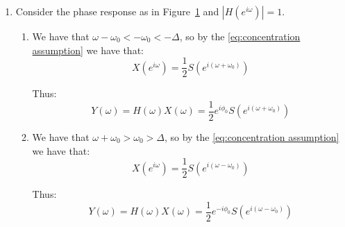 \begin{enumerate}
    \item \label{pt:phase step} Consider the phase response as in Figure~\ref{fig:phase response shelf} and $|H(e^{i\omega})| = 1$.
          \begin{figure}[ht!]
              \centering
              \caption{}
              \label{fig:phase response shelf}
          \end{figure}

          \begin{enumerate}[align = left]
              \item[``$\omega < 0$'':] \hfill

                    We have that $\omega - \omega_0 < -\omega_0 < -\Delta$, so by the \ref{eq:concentration assumption} we have that:
                    \[X(e^{i\omega}) = \frac{1}{2} S(e^{i(\omega + \omega_0)})\]

                    Thus:
                    \[Y(\omega)
                        = H(\omega) X(\omega)
                        = \frac{1}{2} e^{i\phi_0} S(e^{i(\omega + \omega_0)})\]
              \item[``$\omega \geq 0$'':] \hfill

                    We have that $\omega + \omega_0 > \omega_0 > \Delta$, so by the \ref{eq:concentration assumption} we have that:
                    \[X(e^{i\omega}) = \frac{1}{2} S(e^{i(\omega - \omega_0)})\]

                    Thus:
                    \[Y(\omega)
                        = H(\omega) X(\omega)
                        = \frac{1}{2} e^{-i\phi_0} S(e^{i(\omega - \omega_0)})\]
          \end{enumerate}


\end{enumerate}
